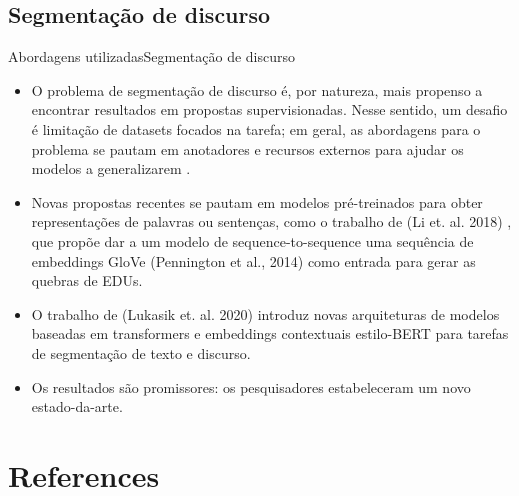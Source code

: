 \documentclass[10pt]{beamer}
\begin{document}
\subsection{Segmentação de discurso}
\begin{frame}[allowframebreaks]{Abordagens utilizadas}{Segmentação de discurso}
    \begin{itemize}
        \item O problema de segmentação de discurso é, por natureza, mais propenso a encontrar resultados em propostas supervisionadas. Nesse sentido, um desafio é limitação de datasets focados na tarefa; em geral, as abordagens para o problema se pautam em anotadores e recursos externos para ajudar os modelos a generalizarem \cite{attention_google}.
        
        \item Novas propostas recentes se pautam em modelos pré-treinados para obter representações de palavras ou sentenças, como o trabalho de (Li et. al. 2018) \cite{seg_bot}, que propõe dar a um modelo de sequence-to-sequence uma sequência de embeddings GloVe (Pennington et al., 2014) \cite{glove} como entrada para gerar as quebras de EDUs.
        \framebreak
        \item O trabalho de (Lukasik et. al. 2020) \cite{attention_google} introduz novas arquiteturas de modelos baseadas em transformers e embeddings contextuais estilo-BERT para tarefas de segmentação de texto e discurso.
        
        \item Os resultados são promissores: os pesquisadores estabeleceram um novo estado-da-arte.

    \end{itemize}

\end{frame}


\section{References}
\end{document}
